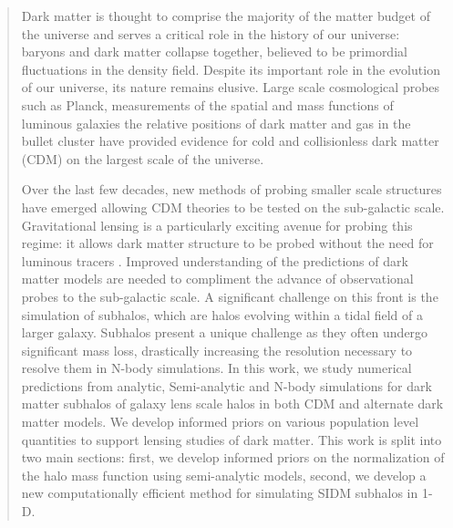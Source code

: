 \begin{abstract} 
 Dark matter is thought to comprise the majority of the matter budget of the universe and serves a critical role in the history of our universe: baryons and dark matter collapse together, believed to be primordial fluctuations in the density field. 
 Despite its important role in the evolution of our universe, its nature remains elusive.
 Large scale cosmological probes such as Planck, measurements of the spatial and mass functions of luminous galaxies the relative positions of dark matter and gas in the bullet cluster have provided evidence for cold and collisionless dark matter (CDM) on the largest scale of the universe.  
 
 Over the last few decades, new methods of probing smaller scale structures have emerged allowing CDM theories to be tested on the sub-galactic scale.
 Gravitational lensing is a particularly exciting avenue for probing this regime: it allows dark matter structure to be probed without the need for luminous tracers . 
 Improved understanding of the predictions of dark matter models are needed to compliment the advance of observational probes to the sub-galactic scale. 
 A significant challenge on this front is the simulation of subhalos, which are halos evolving within a tidal field of a larger galaxy. Subhalos present a unique challenge as they often undergo significant mass loss, drastically increasing the resolution necessary to resolve them in N-body simulations. 
 In this work, we study numerical predictions from analytic, Semi-analytic and N-body simulations for dark matter subhalos of galaxy lens scale halos in both CDM and alternate dark matter models. We develop informed priors on various population level quantities to support lensing studies of dark matter.
 This work is split into two main sections: first, we develop informed priors on the normalization of the halo mass function using semi-analytic models, second, we develop a new computationally efficient method for simulating SIDM subhalos in 1-D. 


\end{abstract}

